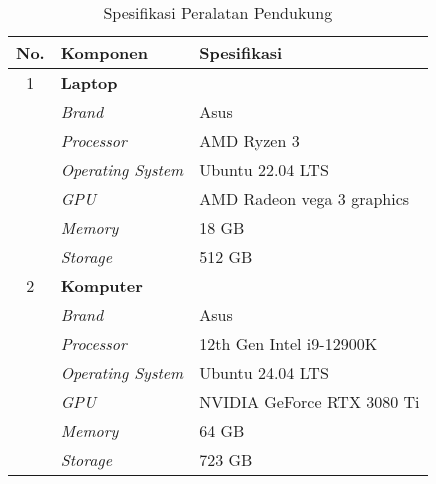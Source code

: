 \begin{table}[H]
  \centering
  \caption{Spesifikasi Peralatan Pendukung}
  \label{tab:peralatan-pendukung}
  \begin{tabularx}{\textwidth}{|c|X|X|}
    \hline
    \textbf{No.} & \textbf{Komponen}                        & \textbf{Spesifikasi}       \\ \hline
    1            & \multicolumn{2}{l|}{\textbf{Laptop}}                              \\ \hline
                 & \textit{Brand}                           & Asus                     \\ \hline
                 & \textit{Processor}                       & AMD Ryzen 3              \\ \hline
                 & \textit{Operating System}                & Ubuntu 22.04 LTS                 \\ \hline
                 & \textit{GPU}                             & AMD Radeon vega 3 graphics \\ \hline
                 & \textit{Memory}                          & 18 GB                      \\ \hline
                 & \textit{Storage}                         & 512 GB                       \\ \hline

    2            & \multicolumn{2}{l|}{\textbf{Komputer}}                              \\ \hline
                 & \textit{Brand}                           & Asus                     \\ \hline
                 & \textit{Processor}                       & 12th Gen Intel i9-12900K \\ \hline
                 & \textit{Operating System}                & Ubuntu 24.04 LTS                 \\ \hline
                 & \textit{GPU}                             & NVIDIA GeForce RTX 3080 Ti \\ \hline
                 & \textit{Memory}                          & 64 GB                      \\ \hline
                 & \textit{Storage}                         & 723 GB                       \\ \hline
                 

\end{tabularx}
\end{table}
